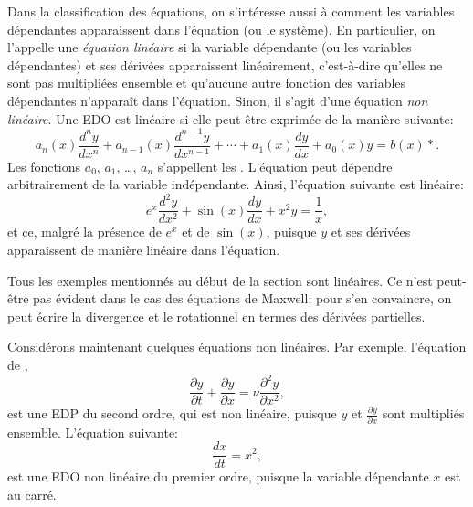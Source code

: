 Dans la classification des équations, on s'intéresse aussi à comment les variables dépendantes apparaissent dans l'équation (ou le système).  En particulier, on l'appelle une 
\emph{équation linéaire} si la variable dépendante (ou les variables dépendantes) et ses dérivées apparaissent linéairement,  c'est-à-dire qu'elles ne sont pas multipliées ensemble et qu'aucune autre fonction des variables dépendantes n'apparaît dans l'équation.  Sinon, il s'agit d'une équation 
\emph{non linéaire}.  Une EDO est linéaire si elle peut être exprimée de la manière suivante: 
\begin{equation} \label{classification:eqlingen}
a_n(x) \frac{d^n y}{dx^n} 
	+ a_{n-1}(x) \frac{d^{n-1} y}{dx^{n-1}} 
	+ \cdots
	+ a_{1}(x) \frac{dy}{dx} 
	+ a_{0}(x) y 
	= b(x) *.
\end{equation}
Les fonctions $a_0$, $a_1$, \ldots, $a_n$ s'appellent les
\emph{}.
L'équation peut dépendre arbitrairement de la variable indépendante.  Ainsi, l'équation suivante est linéaire:
\begin{equation} \label{classification:eqlinex}
	e^x \frac{d^2 y}{dx^2} + \sin(x) \frac{d y}{dx} +  x^2 y = \frac{1}{x},
\end{equation}
et ce, malgré la présence de $e^x$ et de $\sin(x)$, puisque $y$ et ses dérivées apparaissent de manière linéaire dans l'équation.

Tous les exemples mentionnés au début de la section sont linéaires.  Ce n'est peut-être pas évident dans le cas des équations de Maxwell; pour s'en convaincre, on peut écrire la divergence et le rotationnel en termes des dérivées partielles. 

Considérons maintenant quelques équations non linéaires.  Par exemple, l'équation de , 
\begin{equation*}
	\frac{\partial y}{\partial t} +  \frac{\partial y}{\partial x} 
	= \nu \frac{\partial^2 y}{\partial x^2}, 
\end{equation*}
est une EDP du second ordre, qui est non linéaire, puisque $y$ et $\frac{\partial y}{\partial x}$ sont multipliés ensemble.
L'équation suivante: 
\begin{equation} \label{classification:eqnonlinode}
	\frac{dx}{dt} = x^2,
\end{equation}
est une EDO non linéaire du premier ordre, puisque la variable dépendante $x$ est au carré.

\medskip

